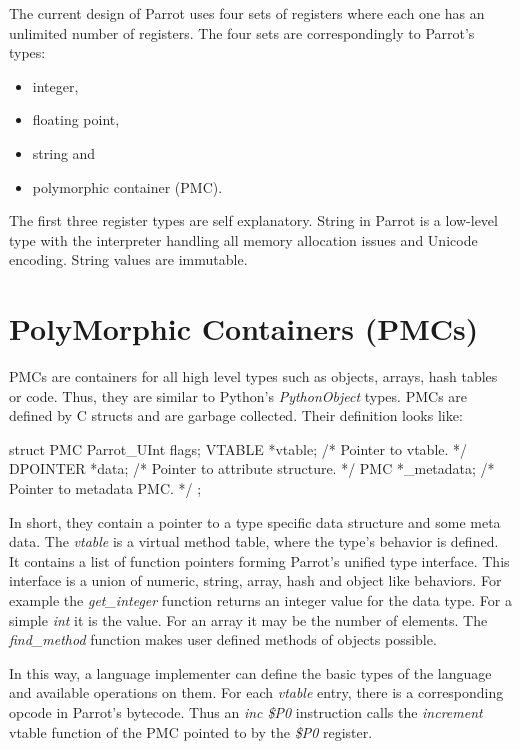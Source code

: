 \documentclass[bachelor,english]{hgbthesis}
\begin{document}
The current design of Parrot uses four sets of registers where each one has an unlimited number of registers. The four sets are correspondingly to Parrot's types:
%
\begin{itemize}
\item integer,
\item floating point,
\item string and
\item polymorphic container (PMC).
\end{itemize}

The first three register types are self explanatory. String in Parrot is a low-level type with the interpreter handling all memory allocation issues and Unicode encoding. String values are immutable.

\section{PolyMorphic Containers (PMCs)}
\label{sec:PMCs}

PMCs are containers for all high level types such as objects, arrays, hash tables or code. Thus, they are similar to Python's \textit{PythonObject} types. PMCs are defined by C structs and are garbage collected. Their definition looks like:
\begin{CCode}
struct PMC {
    Parrot_UInt    flags;
    VTABLE         *vtable;             /* Pointer to vtable. */
    DPOINTER       *data;               /* Pointer to attribute structure. */
    PMC            *_metadata;          /* Pointer to metadata PMC. */
};
\end{CCode}
In short, they contain a pointer to a type specific data structure and some meta data. The \textit{vtable} is a virtual method table, where the type's behavior is defined. It contains a list of function pointers forming Parrot's unified type interface. This interface is a union of numeric, string, array, hash and object like behaviors. For example the  \textit{get\_integer} function returns an integer value for the data type. For a simple \textit{int} it is the value. For an array it may be the number of elements. The \textit{find\_method} function makes user defined methods of objects possible.

In this way, a language implementer can define the basic types of the language and available operations on them. For each \textit{vtable} entry, there is a corresponding opcode in Parrot's bytecode. Thus an \textit{inc \$P0} instruction calls the \textit{increment} vtable function of the PMC pointed to by the \textit{\$P0} register.
\end{document}
